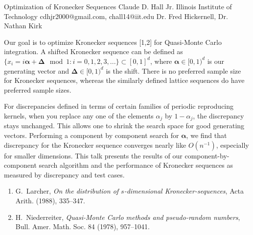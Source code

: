 \begin{talk}
  {Optimization of Kronecker Sequences}%
  {Claude D. Hall Jr.}%
  {Illinois Institute of Technology}%
  {cdhjr2000@gmail.com, chall14@iit.edu}%
  {Dr. Fred Hickernell, Dr. Nathan Kirk}%
  
    

Our goal is to optimize Kronecker sequences [1,2] for Quasi-Monte Carlo integration. A shifted Kronecker sequence can be defined as $\{ x_i = i \boldsymbol{\alpha} + \boldsymbol{\Delta} \mod 1: i = 0, 1, 2, 3, ... \} \subset [0,1]^d $, where  $\boldsymbol{\alpha} \in [0,1)^d$ is our generating vector and $\boldsymbol{\Delta} \in [0,1)^d$ is the shift. There is no preferred sample size for Kronecker sequences, whereas the similarly defined lattice sequences do have preferred sample sizes. 

For discrepancies defined in terms of certain families of periodic reproducing kernels, when you replace any one of the elements $\alpha_j$ by $1 - \alpha_j$, the discrepancy stays unchanged. This allows one to shrink the search space for good generating vectors.  Performing a component by component search for $\boldsymbol{\alpha}$, we find that discrepancy for the Kronecker sequence converges nearly like $O(n^{-1})$, especially for smaller dimensions.  This talk presents the results of our component-by-component search algorithm and the performance of Kronecker sequences as measured by discrepancy and test cases.

\medskip

\begin{enumerate}
 \item[{[1]}] G.~Larcher, \emph{On the distribution of $s$-dimensional {K}ronecker-sequences}, Acta Arith. (1988), 335--347.
 \item[{[2]}] H.~Niederreiter, \emph{Quasi-Monte Carlo methods and pseudo-random numbers}, Bull. Amer. Math. Soc. 84 (1978), 957--1041.
\end{enumerate}
\end{talk}
